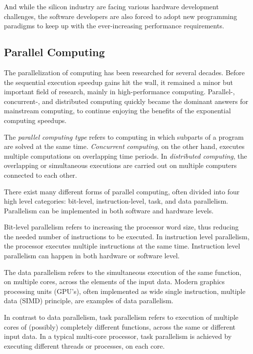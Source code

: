 And while the silicon industry are facing various hardware development challenges, the software developers are also forced to adopt new programming paradigms to keep up with the ever-increasing performance requirements.~\cite{Sutter:2005:FLiO}

\subsection{Parallel Computing}
\label{subsection:parallel-computing}

The parallelization of computing has been researched for several decades. Before the sequential execution speedup gains hit the wall, it remained a minor but important field of research, mainly in high-performance computing. Parallel-, concurrent-, and distributed computing quickly became the dominant answers for mainstream computing, to continue enjoying the benefits of the exponential computing speedups.

The \emph{parallel computing type} refers to computing in which subparts of a program are solved at the same time. \emph{Concurrent computing}, on the other hand, executes multiple computations on overlapping time periods. In \emph{distributed computing}, the overlapping or simultaneous executions are carried out on multiple computers connected to each other.

There exist many different forms of parallel computing, often divided into four high level categories: bit-level, instruction-level, task, and data parallelism. Parallelism can be implemented in both software and hardware levels.~\cite{Culler:1997:PCA}

Bit-level parallelism refers to increasing the processor word size, thus reducing the needed number of instructions to be executed. In instruction level parallelism, the processor executes multiple instructions at the same time. Instruction level parallelism can happen in both hardware or software level.~\cite{Culler:1997:PCA}

The data parallelism refers to the simultaneous execution of the same function, on multiple cores, across the elements of the input data. Modern graphics processing units (GPU's), often implemented as wide single instruction, multiple data (SIMD) principle, are examples of data parallelism.~\cite{Culler:1997:PCA}

In contrast to data parallelism, task parallelism refers to execution of multiple cores of (possibly) completely different functions, across the same or different input data. In a typical multi-core processor, task parallelism is achieved by executing different threads or processes, on each core.~\cite{Culler:1997:PCA}

